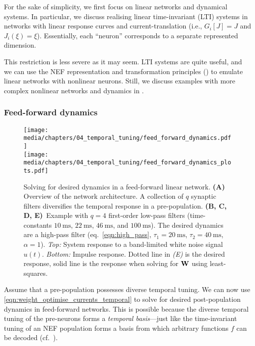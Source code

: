 For the sake of simplicity, we first focus on linear networks and dynamical systems.
In particular, we discuss realising linear time-invariant (LTI) systems in networks with linear response curves and current-translation (i.e., $G_i[J] = J$ and $J_i(\xi) = \xi$).
Essentially, each \enquote{neuron} corresponds to a separate represented dimension.

This restriction is less severe as it may seem.
LTI systems are quite useful, and we can use the NEF representation and transformation principles () to emulate linear networks with nonlinear neurons.
Still, we discuss examples with more complex nonlinear networks and dynamics in .

\subsubsection{Feed-forward dynamics}

\begin{figure}
	\centering
	\texttt{[image: media/chapters/04\_temporal\_tuning/feed\_forward\_dynamics.pdf]}\\[-0.875em]
	\texttt{[image: media/chapters/04\_temporal\_tuning/feed\_forward\_dynamics\_plots.pdf]}
	\caption[Solving for desired dynamics in a feed-forward linear network]{Solving for desired dynamics in a feed-forward linear network.
	\textbf{(A)} Overview of the network architecture. 
	A collection of $q$ synaptic filters diversifies the temporal response in a pre-population.
	\textbf{(B, C, D, E)}~Example with $q = 4$ first-order low-pass filters (time-constants $\SI{10}{\milli\second}$, $\SI{22}{\milli\second}$, $\SI{46}{\milli\second}$, and $\SI{100}{\milli\second}$).
	The desired dynamics are a high-pass filter (eq.~\ref{eqn:high_pass}, $\tau_1 = \SI{20}{\milli\second}$, $\tau_2 = \SI{40}{\milli\second}$, $\alpha = 1$).
	\emph{Top:} System response to a band-limited white noise signal $u(t)$.
	\emph{Bottom:} Impulse response.
	Dotted line in \emph{(E)} is the desired response, solid line is the response when solving for $\mathbf{W}$ using least-squares.
	}
	\label{fig:feed_forward_dynamics}
\end{figure}

Assume that a pre-population possesses diverse temporal tuning.
We can now use \cref{eqn:weight_optimise_currents_temporal} to solve for desired post-population dynamics in feed-forward networks.
This is possible because the diverse temporal tuning of the pre-neurons forms a \emph{temporal basis}---just like the time-invariant tuning of an NEF population forms a basis from which arbitrary functions $f$ can be decoded (cf.~).

